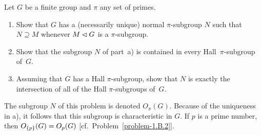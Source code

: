 \begin{probl}\label{problem-1.D.7} Let $G$ be a finite group and $\pi$ any set of primes.
    \begin{enumerate}[\upshape a)]
    \item Show that $G$ has a (necessarily unique) normal\/ $\pi$-subgroup\/ $N$ such that $N \supseteq M$ whenever $M\lhd G$ is a $\pi$-subgroup.

    \item Show that the subgroup\/ $N$ of part\/~{\upshape a)} is contained in every Hall\/~$\pi$-subgroup of\/~$G$.

    \item Assuming that $G$ has a Hall\/ $\pi$-subgroup, show that $N$ is exactly the intersection of all of the Hall\/ $\pi$-subgroups of\/~$G$.
    \end{enumerate}

    \textrm{ The subgroup $N$ of this problem is denoted $O_\pi(G)$. Because of the uniqueness in a), it follows that this subgroup is characteristic in $G$. If $p$ is a prime number, then $O_{\{p\}}(G) = O_p(G)$ [cf.~Problem~\ref{problem-1.B.2}].}
\end{probl}

